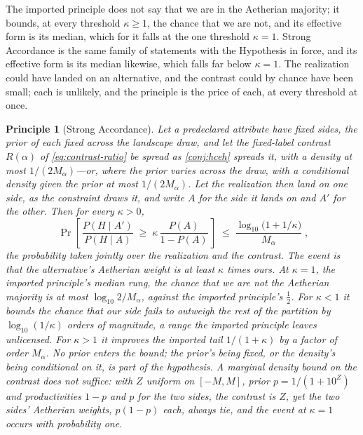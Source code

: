 \documentclass[11pt]{article}
\newtheorem{principle}{Principle}
\theoremstyle{definition}
\begin{document}
\noindent The imported principle does not say that we are in the Aetherian majority; it bounds, at every threshold $\kappa \ge 1$, the chance that we are not, and its effective form is its median, which for it falls at the one threshold $\kappa = 1$. Strong Accordance is the same family of statements with the Hypothesis in force, and its effective form is its median likewise, which falls far below $\kappa = 1$. The realization could have landed on an alternative, and the contrast could by chance have been small; each is unlikely, and the principle is the price of each, at every threshold at once.

\begin{principle}[Strong Accordance]
\label{prin:strong-full}
Let a predeclared attribute have fixed sides, the prior of each fixed across the landscape draw, and let the fixed-label contrast $R(\alpha)$ of \eqref{eq:contrast-ratio} be spread as \autoref{conj:hceh} spreads it, with a density at most $1/(2M_\alpha)$---or, where the prior varies across the draw, with a conditional density given the prior at most $1/(2M_\alpha)$. Let the realization then land on one side, as the constraint draws it, and write $A$ for the side it lands on and $A'$ for the other. Then for every $\kappa > 0$,
\begin{equation}
\label{eq:strong-full}
\boxed{\; \Pr\!\left[\, \frac{P(H \mid A')}{P(H \mid A)} \;\ge\; \kappa\, \frac{P(A)}{1 - P(A)} \,\right] \;\le\; \frac{\log_{10}\!\big(1 + 1/\kappa\big)}{M_\alpha} \;},
\end{equation}
the probability taken jointly over the realization and the contrast. The event is that the alternative's Aetherian weight is at least $\kappa$ times ours. At $\kappa = 1$, the imported principle's median rung, the chance that we are not the Aetherian majority is at most $\log_{10} 2 / M_\alpha$, against the imported principle's $\tfrac12$. For $\kappa < 1$ it bounds the chance that our side fails to outweigh the rest of the partition by $\log_{10}(1/\kappa)$ orders of magnitude, a range the imported principle leaves unlicensed. For $\kappa > 1$ it improves the imported tail $1/(1+\kappa)$ by a factor of order $M_\alpha$. No prior enters the bound; the prior's being fixed, or the density's being conditional on it, is part of the hypothesis. A marginal density bound on the contrast does not suffice: with $Z$ uniform on $[-M, M]$, prior $p = 1/(1 + 10^{Z})$ and productivities $1 - p$ and $p$ for the two sides, the contrast is $Z$, yet the two sides' Aetherian weights, $p(1-p)$ each, always tie, and the event at $\kappa = 1$ occurs with probability one.
\end{principle}
\end{document}
